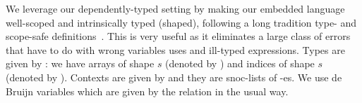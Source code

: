We leverage our dependently-typed setting by making our
embedded language well-scoped and intrinsically typed (shaped),
following a long tradition type- and scope-safe definitions~\cite{intrinsic1,intrinsic2,intrinsic3}.
This is very useful as it eliminates a large class of errors that have to do
with wrong variables uses and ill-typed expressions.
Types are given by : we have arrays of
shape $s$ (denoted by ) and indices of shape $s$
(denoted by ).  Contexts are given by  and they are
snoc-lists of -es.  We use de Bruijn variables which are given
by the relation  in the usual way. 
